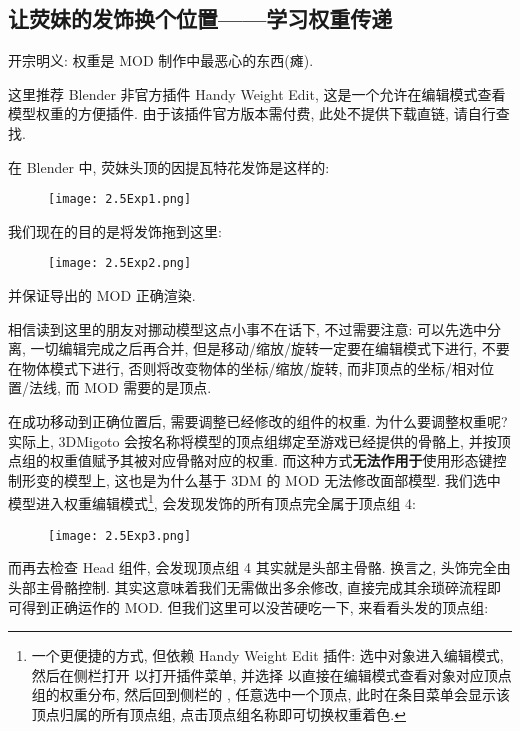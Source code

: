         \subsection{让荧妹的发饰换个位置——学习权重传递}
            \par 开宗明义: 权重是 MOD 制作中最恶心的东西(瘫).
            \par 这里推荐 Blender 非官方插件 Handy Weight Edit, 这是一个允许在编辑模式查看模型权重的方便插件. 由于该插件官方版本需付费, 此处不提供下载直链, 请自行查找.
            \par 在 Blender 中, 荧妹头顶的因提瓦特花发饰是这样的:
                \begin{figure}[H]
                    \centering
                    \texttt{[image: 2.5Exp1.png]}
                \end{figure}
            我们现在的目的是将发饰拖到这里:
                \begin{figure}[H]
                    \centering
                    \texttt{[image: 2.5Exp2.png]}
                \end{figure}
            并保证导出的 MOD 正确渲染.
            \par 相信读到这里的朋友对挪动模型这点小事不在话下, 不过需要注意: 可以先选中分离, 一切编辑完成之后再合并, 但是移动/缩放/旋转一定要在编辑模式下进行, 不要在物体模式下进行, 否则将改变物体的坐标/缩放/旋转, 而非顶点的坐标/相对位置/法线, 而 MOD 需要的是顶点.
            \par 在成功移动到正确位置后, 需要调整已经修改的组件的权重. 为什么要调整权重呢? 实际上, 3DMigoto 会按名称将模型的顶点组绑定至游戏已经提供的骨骼上, 并按顶点组的权重值赋予其被对应骨骼对应的权重. 而这种方式\textbf{无法作用于}使用形态键控制形变的模型上, 这也是为什么基于 3DM 的 MOD 无法修改面部模型. 我们选中模型进入权重编辑模式\footnote{一个更便捷的方式, 但依赖 Handy Weight Edit 插件: 选中对象进入编辑模式, 然后在侧栏打开  以打开插件菜单, 并选择  以直接在编辑模式查看对象对应顶点组的权重分布, 然后回到侧栏的 , 任意选中一个顶点, 此时在条目菜单会显示该顶点归属的所有顶点组, 点击顶点组名称即可切换权重着色.}, 会发现发饰的所有顶点完全属于顶点组 4:
                \begin{figure}[H]
                    \centering
                    \texttt{[image: 2.5Exp3.png]}
                \end{figure}
            而再去检查 Head 组件, 会发现顶点组 4 其实就是头部主骨骼. 换言之, 头饰完全由头部主骨骼控制. 其实这意味着我们无需做出多余修改, 直接完成其余琐碎流程即可得到正确运作的 MOD. 但我们这里可以没苦硬吃一下, 来看看头发的顶点组:
